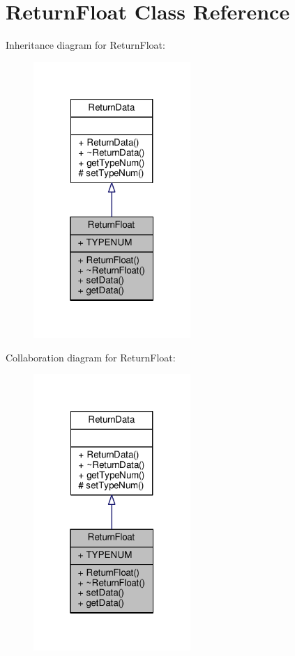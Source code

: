 \hypertarget{classReturnFloat}{}\section{Return\+Float Class Reference}
\label{classReturnFloat}


Inheritance diagram for Return\+Float\+:
\nopagebreak
\begin{figure}[H]
\begin{center}
\leavevmode
\includegraphics[width=169pt]{classReturnFloat__inherit__graph}
\end{center}
\end{figure}


Collaboration diagram for Return\+Float\+:
\nopagebreak
\begin{figure}[H]
\begin{center}
\leavevmode
\includegraphics[width=169pt]{classReturnFloat__coll__graph}
\end{center}
\end{figure}
